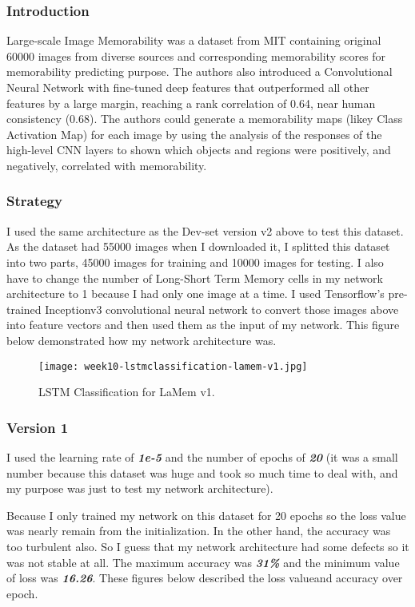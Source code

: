 \subsubsection{Introduction}
Large-scale Image Memorability\cite{lamem} was a dataset from MIT containing original 60000 images from diverse sources and corresponding memorability scores for memorability predicting purpose. The authors also introduced a Convolutional Neural Network with fine-tuned deep features that outperformed all other features by a large margin, reaching a rank correlation of 0.64, near human consistency (0.68). The authors could generate a memorability maps (likey Class Activation Map) for each image by using the analysis of the responses of the high-level CNN layers to shown which objects and regions were positively, and negatively, correlated with memorability.

\subsubsection{Strategy}
I used the same architecture as the Dev-set version v2 above to test this dataset. As the dataset had 55000 images when I downloaded it, I splitted this dataset into two parts, 45000 images for training and 10000 images for testing. I also have to change the number of Long-Short Term Memory cells in my network architecture to 1 because I had only one image at a time. I used Tensorflow's pre-trained Inceptionv3 convolutional neural network to convert those images above into feature vectors and then used them as the input of my network. This figure below demonstrated how my network architecture was.

\newpage
\begin{figure}[!ht]
\centering
\texttt{[image: week10-lstmclassification-lamem-v1.jpg]}
\caption{LSTM Classification for LaMem v1.}
\end{figure}

\subsubsection{Version 1}
I used the learning rate of \textbf{\emph{1e-5}} and the number of epochs of \textbf{\emph{20}} (it was a small number because this dataset was huge and took so much time to deal with, and my purpose was just to test my network architecture).

Because I only trained my network on this dataset for 20 epochs so the loss value was nearly remain from the initialization. In the other hand, the accuracy was too turbulent also. So I guess that my network architecture had some defects so it was not stable at all. The maximum accuracy was \textbf{\emph{31\%}} and the minimum value of loss was \textbf{\emph{16.26}}. These figures below described the loss valueand accuracy over epoch.

